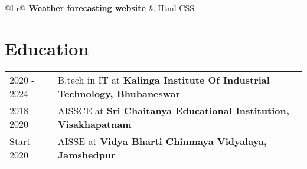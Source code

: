 \documentclass[a4paper,10pt]{article}
\begin{document}
\begin{tabularx}{\linewidth}{ @{}l r@{} }
\textbf{Weather forecasting website} & \hfill {Html CSS} \\[3.75pt]
\end{tabularx}
\section{Education}
\begin{tabularx}{\linewidth}{@{}l X@{}}	
2020 - 2024 & B.tech in IT at \textbf{Kalinga Institute Of Industrial Technology, Bhubaneswar}  \\
2018 - 2020 & AISSCE at \textbf{Sri Chaitanya Educational Institution, Visakhapatnam}\\ 
Start - 2020 & AISSE at \textbf{Vidya Bharti Chinmaya Vidyalaya, Jamshedpur}  \\
\end{tabularx}
\end{document}
